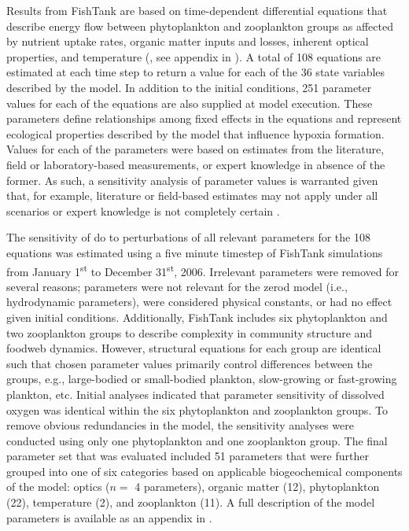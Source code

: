 \documentclass[letterpaper,12pt,oneside]{article}\usepackage[]{graphicx}\usepackage[]{color}
\begin{document}
Results from FishTank are based on time-dependent differential equations that describe energy flow between phytoplankton and zooplankton groups as affected by nutrient uptake rates, organic matter inputs and losses, inherent optical properties, and temperature (\citealt{Penta08,Eldridge10}, see appendix in ).  A total of 108 equations are estimated at each time step to return a value for each of the 36 state variables described by the model.  In addition to the initial conditions, 251 parameter values for each of the equations are also supplied at model execution.  These parameters define relationships among fixed effects in the equations and represent ecological properties described by the model that influence hypoxia formation.  Values for each of the parameters were based on estimates from the literature, field or laboratory-based measurements, or expert knowledge in absence of the former.  As such, a sensitivity analysis of parameter values is warranted given that, for example, literature or field-based estimates may not apply under all scenarios or expert knowledge is not completely certain \citep{Refsgaard07}.



The sensitivity of \ac{do} to perturbations of all relevant parameters for the 108 equations was estimated using a five minute timestep of FishTank simulations from January 1\textsuperscript{st} to December 31\textsuperscript{st}, 2006. Irrelevant parameters were removed for several reasons; parameters were not relevant for the \ac{zerod} model (i.e., hydrodynamic parameters), were considered physical constants, or had no effect given initial conditions.  Additionally, FishTank includes six phytoplankton and two zooplankton groups to describe complexity in community structure and foodweb dynamics.  However, structural equations for each group are identical such that chosen parameter values primarily control differences between the groups, e.g., large-bodied or small-bodied plankton, slow-growing or fast-growing plankton, etc.  Initial analyses indicated that parameter sensitivity of dissolved oxygen was identical within the six phytoplankton and zooplankton groups.  To remove obvious redundancies in the model, the sensitivity analyses were conducted using only one phytoplankton and one zooplankton group.  The final parameter set that was evaluated included 51 parameters that were further grouped into one of six categories based on applicable biogeochemical components of the model: optics ($n = $ 4 parameters), organic matter (12), phytoplankton (22), temperature (2), and zooplankton (11).  A full description of the model parameters is available as an appendix in .  
\end{document}
